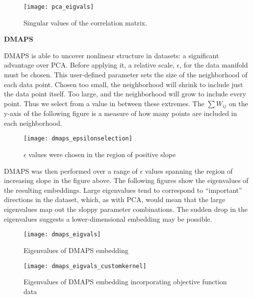 \documentclass[12pt]{article}
\begin{document}
\begin{figure}[h!]
  \texttt{[image: pca\_eigvals]}
  \caption{Singular values of the correlation matrix.}
\end{figure}

\textbf{DMAPS}

DMAPS is able to uncover nonlinear structure in datasets: a significant advantage over PCA. Before applying it, a relative scale, $\epsilon$, for the data manifold must be chosen. This user-defined parameter sets the size of the neighborhood of each data point. Chosen too small, the neighborhood will shrink to include just the data point itself. Too large, and the neighborhood will grow to include every point. Thus we select from a value in between these extremes. The $\sum W_{ij}$ on the y-axis of the following figure is a measure of how many points are included in each neighborhood. 

\begin{figure}[h!]
  \texttt{[image: dmaps\_epsilonselection]}
  \caption{$\epsilon$ values were chosen in the region of positive slope}
\end{figure}

DMAPS was then performed over a range of $\epsilon$ values spanning the region of increasing slope in the figure above. The following figures show the eigenvalues of the resulting embeddings. Large eigenvalues tend to correspond to ``important'' directions in the dataset, which, as with PCA, would mean that the large eigenvalues map out the sloppy parameter combinations. The sudden drop in the eigenvalues suggests a lower-dimensional embedding may be possible.

\begin{figure}[h!]
  \texttt{[image: dmaps\_eigvals]}
  \caption{Eigenvalues of DMAPS embedding}
\end{figure}

\begin{figure}[h!]
  \texttt{[image: dmaps\_eigvals\_customkernel]}
  \caption{Eigenvalues of DMAPS embedding incorporating objective function data}
\end{figure}
\end{document}
